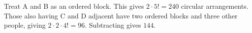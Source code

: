 Treat A and B as an ordered block. This gives $2\cdot5!=240$ circular arrangements. Those also having C and D adjacent have two ordered blocks and three other people, giving $2\cdot2\cdot4!=96$. Subtracting gives $\boxed{144}$.
